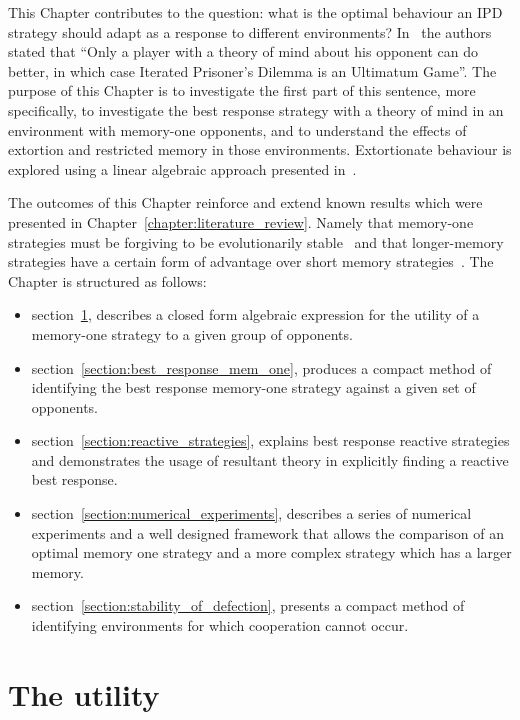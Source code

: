 This Chapter contributes to the question: what is the optimal behaviour an IPD
strategy should adapt as a response to different environments?
In~\cite{Press2012} the authors stated that ``Only a player with a theory of
mind about his opponent can do better, in which case Iterated Prisoner's Dilemma
is an Ultimatum Game''. The purpose of this Chapter is to investigate the first
part of this sentence, more specifically, to investigate the best response
strategy with a theory of mind in an environment with memory-one opponents, and
to understand the effects of extortion and restricted memory in those
environments. Extortionate behaviour is explored using a linear algebraic
approach presented in~\cite{Knight2019}.

The outcomes of this Chapter reinforce and extend known results which were presented in
Chapter~\ref{chapter:literature_review}. Namely that memory-one strategies must
be forgiving to be evolutionarily stable~\cite{Stewart2013, Stewart2016} and
that longer-memory strategies have a certain form of advantage over short memory
strategies~\cite{Hilbe2017, Pan2015}. The Chapter is structured as follows:

\begin{itemize}
    \item section~\ref{section:utility}, describes a closed form algebraic expression for
    the utility of a memory-one strategy to a given group of opponents.
    \item section~\ref{section:best_response_mem_one}, produces a compact method
    of identifying the best response memory-one strategy against a given set
    of opponents.
    \item section~\ref{section:reactive_strategies}, explains best response reactive
    strategies and demonstrates the usage of resultant theory in explicitly finding
    a reactive best response.
    \item section~\ref{section:numerical_experiments}, describes a series of numerical experiments
    and a well designed framework that allows the
    comparison of an optimal memory one strategy and a more complex strategy which
    has a larger memory.
    \item section~\ref{section:stability_of_defection}, presents a compact method of identifying environments
    for which cooperation cannot occur.
\end{itemize}


\section{The utility}\label{section:utility}

